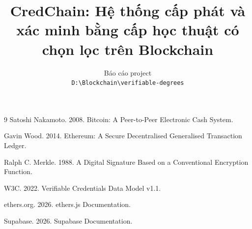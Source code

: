 \documentclass[11pt]{article}
\title{CredChain: Hệ thống cấp phát và xác minh bằng cấp học thuật có chọn lọc trên Blockchain}
\author{Báo cáo project \\
  \texttt{D:\textbackslash Blockchain\textbackslash verifiable-degrees}}
\begin{document}
\twocolumn[
\maketitle
\begin{onecolabstract}

\end{onecolabstract}
]










\begin{thebibliography}{9}
Satoshi Nakamoto. 2008.
\newblock Bitcoin: A Peer-to-Peer Electronic Cash System.

Gavin Wood. 2014.
\newblock Ethereum: A Secure Decentralised Generalised Transaction Ledger.

Ralph C. Merkle. 1988.
\newblock A Digital Signature Based on a Conventional Encryption Function.

W3C. 2022.
\newblock Verifiable Credentials Data Model v1.1.

ethers.org. 2026.
\newblock ethers.js Documentation.

Supabase. 2026.
\newblock Supabase Documentation.
\end{thebibliography}
\end{document}
